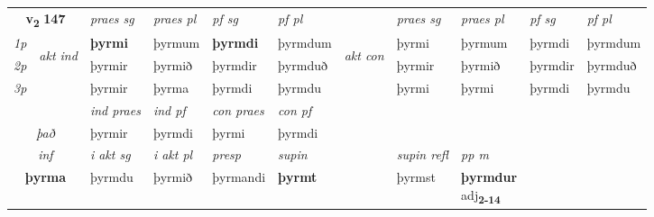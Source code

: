 \noindent
\begin{tabular}{lllllllllll} \toprule
\multicolumn{2}{c}{\textbf{v{\textsubscript{2}}} \Large{\textbf{147}}}  &  \textit{praes sg}  & \textit{praes pl}  &\textit{ pf sg} & \textit{pf pl} &  &  \textit{praes sg}  & \textit{praes pl}  & \textit{pf sg} & \textit{pf pl } \\*
	\cmidrule{3-6} \cmidrule{8-11}
 {\textit{1p}} & \multirow{3}{*}{\begin{turn}{90}\textit{akt ind}\end{turn}} & \textbf{þyrmi} & þyrmum & \textbf{þyrmdi} & þyrmdum & \multirow{3}{*}{\begin{turn}{90}\textit{akt con}\end{turn}} &þyrmi & þyrmum & þyrmdi & þyrmdum\\*
 {\textit{2p}} &  &  þyrmir  & þyrmið & þyrmdir & þyrmduð & & þyrmir & þyrmið & þyrmdir & þyrmduð \\*
{\textit{3p}} &  & þyrmir & þyrma & þyrmdi & þyrmdu & & þyrmi & þyrmi& þyrmdi & þyrmdu \\*
\cmidrule{3-6} \cmidrule{8-11}

   & &  \textit{ind praes} & \textit{ind pf} & \textit{con praes} & \textit{con pf} \\*
\multicolumn{2}{c}{ \textit{það} } & þyrmir & þyrmdi & þyrmi & þyrmdi \\*

\cmidrule{3-9}
   \multicolumn{2}{c}{\textit{inf}}  & \textit{i akt sg} & \textit{i akt pl}   & \textit{presp} & \textit{supin} && \textit{supin refl} & \textit{pp m} \\*
  \multicolumn{2}{c}{\textbf{þyrma}} & þyrmdu  & þyrmið   & þyrmandi &  \textbf{þyrmt} && þyrmst & \specialcell{\textbf{þyrmdur} \\ adj\textbf{\textsubscript{2-14}}} \\*
\end{tabular}

